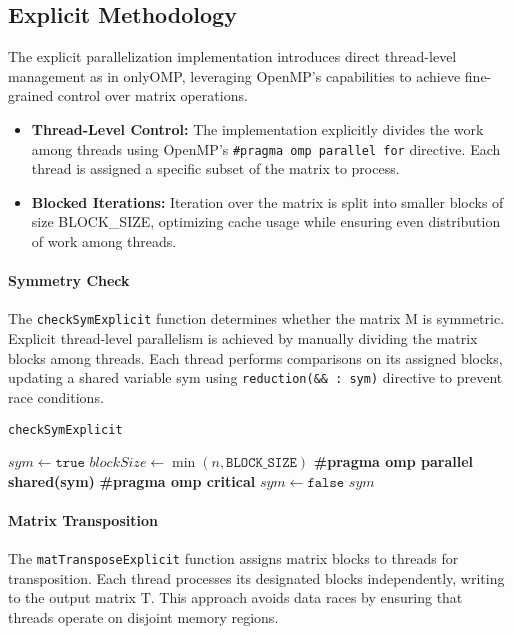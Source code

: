 \documentclass[conference]{IEEEtran}
\begin{document}
\subsection{Explicit Methodology} The explicit parallelization implementation introduces direct thread-level management as in onlyOMP, leveraging OpenMP's capabilities to achieve fine-grained control over matrix operations.

\begin{itemize} \item \textbf{Thread-Level Control:} The implementation explicitly divides the work among threads using OpenMP's \texttt{\#pragma omp parallel for} directive. Each thread is assigned a specific subset of the matrix to process. \item \textbf{Blocked Iterations:} Iteration over the matrix is split into smaller blocks of size 
BLOCK\_SIZE, optimizing cache usage while ensuring even distribution of work among threads. \end{itemize}

\paragraph{Symmetry Check}
The \texttt{checkSymExplicit} function determines whether the matrix 
M is symmetric. Explicit thread-level parallelism is achieved by manually dividing the matrix blocks among threads. Each thread performs comparisons on its assigned blocks, updating a shared variable sym using \texttt{reduction(\&\& : sym)} directive to prevent race conditions.

\begin{algorithm} \caption{\texttt{checkSymExplicit}} \begin{algorithmic}[1] \State $sym \gets \texttt{true}$ \State $blockSize \gets \min(n, \texttt{BLOCK\_SIZE})$ \State \textbf{\#pragma omp parallel shared(sym)}     \State \textbf{\#pragma omp critical}  \State $sym \gets \texttt{false}$ \EndIf \EndFor \EndFor \EndFor \EndFor \State \Return $sym$ \end{algorithmic} \end{algorithm}

\paragraph{Matrix Transposition}
The \texttt{matTransposeExplicit} function assigns matrix blocks to threads for transposition. Each thread processes its designated blocks independently, writing to the output matrix 
T. This approach avoids data races by ensuring that threads operate on disjoint memory regions.
\end{document}
